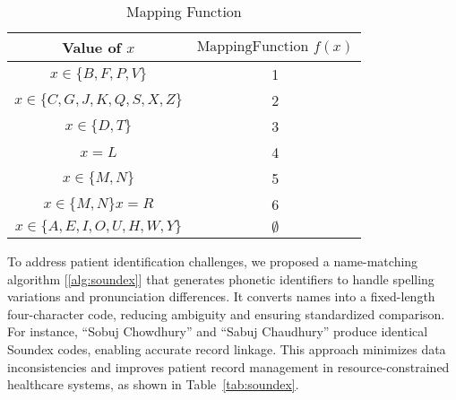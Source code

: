 
\begin{table}[!h]
    \centering
    \caption{Mapping Function}
    \label{tab:map_func}
    \begin{tabular}{c|c}
    \toprule
         Value of $x$&  $\text{MappingFunction }f(x)$\\
         \midrule
         $x \in \{B, F, P, V\}$ & 1\\
         $x \in \{C, G, J, K, Q, S, X, Z\}$ &2\\
         $x \in \{D, T\}$ &3\\
         $x=L$ &4\\
         $x \in \{M, N\}$ &5\\
         $x \in \{M, N\}x = R$ &6\\
         $x \in \{A, E, I, O, U, H, W, Y\}$ &$\emptyset$ \\ 
         \bottomrule
    \end{tabular}
\end{table}
To address patient identification challenges, we proposed a name-matching algorithm [\ref{alg:soundex}] that generates phonetic identifiers to handle spelling variations and pronunciation differences. It converts names into a fixed-length four-character code, reducing ambiguity and ensuring standardized comparison. For instance, “Sobuj Chowdhury” and “Sabuj Chaudhury” produce identical Soundex codes, enabling accurate record linkage. This approach minimizes data inconsistencies and improves patient record management in resource-constrained healthcare systems, as shown in Table~\ref{tab:soundex}.
